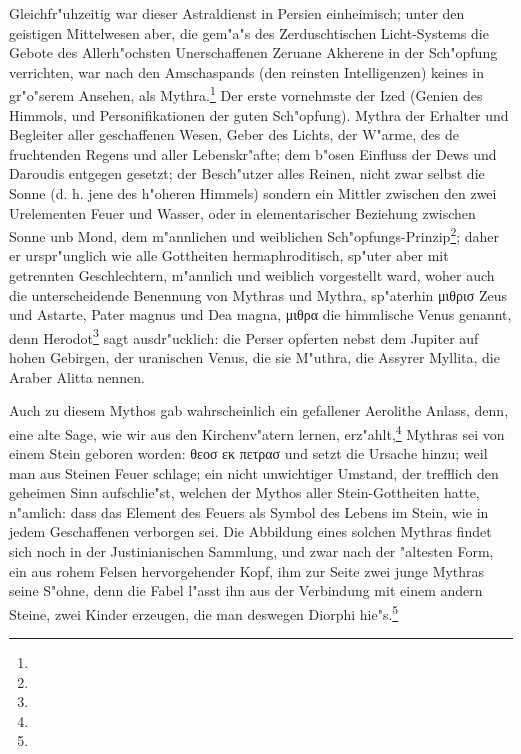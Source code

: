 \documentclass[a4paper, 11pt, oneside, polutonikogreek, german]{article}
\begin{document}
Gleichfr"uhzeitig war dieser Astraldienst in Persien einheimisch; unter den geistigen Mittelwesen aber, die gem"a"s des Zerduschtischen Licht-Systems die Gebote des Allerh"ochsten Unerschaffenen Zeruane Akherene in der Sch"opfung verrichten, war nach den Amschaspands (den reinsten Intelligenzen) keines in gr"o"serem Ansehen, als Mythra.\footnote{} Der erste vornehmste der Ized (Genien des Himmols, und Personifikationen der guten Sch"opfung). Mythra der Erhalter und Begleiter aller geschaffenen Wesen, Geber des Lichts, der W"arme, des de fruchtenden Regens und aller Lebenskr"afte; dem b"osen Einfluss der Dews und Daroudis entgegen gesetzt; der Besch"utzer alles Reinen, nicht zwar selbst die Sonne (d. h. jene des h"oheren Himmels) sondern ein Mittler zwischen den zwei Urelementen Feuer und Wasser, oder in elementarischer Beziehung zwischen Sonne unb Mond, dem m"annlichen und weiblichen Sch"opfungs-Prinzip\footnote{}; daher er urspr"unglich wie alle Gottheiten hermaphroditisch, sp"uter aber mit getrennten Geschlechtern, m"annlich und weiblich vorgestellt ward, woher auch die unterscheidende Benennung von Mythras und Mythra, sp"aterhin μιθρισ Zeus und Astarte, Pater magnus und Dea magna, μιθρα die himmlische Venus genannt, denn Herodot\footnote{} sagt ausdr"ucklich: die Perser opferten nebst dem Jupiter auf hohen Gebirgen, der uranischen Venus, die sie M"uthra, die Assyrer Myllita, die Araber Alitta nennen.

Auch zu diesem Mythos gab wahrscheinlich ein gefallener Aerolithe Anlass, denn, eine alte Sage, wie wir aus den Kirchenv"atern lernen, erz"ahlt,\footnote{} Mythras sei von einem Stein geboren worden: θεοσ εκ πετρασ und setzt die Ursache hinzu; weil man aus Steinen Feuer schlage; ein nicht unwichtiger Umstand, der trefflich den geheimen Sinn aufschlie"st, welchen der Mythos aller Stein-Gottheiten hatte, n"amlich: dass das Element des Feuers als Symbol des Lebens im Stein, wie in jedem Geschaffenen verborgen sei. Die Abbildung eines solchen Mythras findet sich noch in der Justinianischen Sammlung, und zwar nach der "altesten Form, ein aus rohem Felsen hervorgehender Kopf, ihm zur Seite zwei junge Mythras seine S"ohne, denn die Fabel l"asst ihn aus der Verbindung mit einem andern Steine, zwei Kinder erzeugen, die man deswegen Diorphi hie"s.\footnote{}
\end{document}

